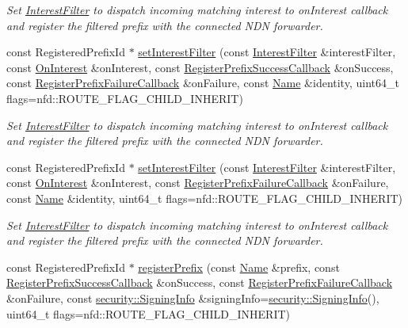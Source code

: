 \begin{DoxyCompactItemize}
\begin{DoxyCompactList}\small\item\em Set \hyperlink{classndn_1_1InterestFilter}{Interest\+Filter} to dispatch incoming matching interest to on\+Interest callback and register the filtered prefix with the connected N\+DN forwarder. \end{DoxyCompactList}\item 
const Registered\+Prefix\+Id $\ast$ \hyperlink{classndn_1_1Face_a95b9bd1df79b918bb8eef4943bc193c4}{set\+Interest\+Filter} (const \hyperlink{classndn_1_1InterestFilter}{Interest\+Filter} \&interest\+Filter, const \hyperlink{namespacendn_a6ddca075866d76508a3dd3b15533cac2}{On\+Interest} \&on\+Interest, const \hyperlink{namespacendn_a80b158f94737f73bec3f9af27161e899}{Register\+Prefix\+Success\+Callback} \&on\+Success, const \hyperlink{namespacendn_a691d213d0f708593217feeae517f3e45}{Register\+Prefix\+Failure\+Callback} \&on\+Failure, const \hyperlink{classndn_1_1Name}{Name} \&identity, uint64\+\_\+t flags=nfd\+::\+R\+O\+U\+T\+E\+\_\+\+F\+L\+A\+G\+\_\+\+C\+H\+I\+L\+D\+\_\+\+I\+N\+H\+E\+R\+IT)
\begin{DoxyCompactList}\small\item\em Set \hyperlink{classndn_1_1InterestFilter}{Interest\+Filter} to dispatch incoming matching interest to on\+Interest callback and register the filtered prefix with the connected N\+DN forwarder. \end{DoxyCompactList}\item 
const Registered\+Prefix\+Id $\ast$ \hyperlink{classndn_1_1Face_a7d7615722245eeac4c22be7124e26d7c}{set\+Interest\+Filter} (const \hyperlink{classndn_1_1InterestFilter}{Interest\+Filter} \&interest\+Filter, const \hyperlink{namespacendn_a6ddca075866d76508a3dd3b15533cac2}{On\+Interest} \&on\+Interest, const \hyperlink{namespacendn_a691d213d0f708593217feeae517f3e45}{Register\+Prefix\+Failure\+Callback} \&on\+Failure, const \hyperlink{classndn_1_1Name}{Name} \&identity, uint64\+\_\+t flags=nfd\+::\+R\+O\+U\+T\+E\+\_\+\+F\+L\+A\+G\+\_\+\+C\+H\+I\+L\+D\+\_\+\+I\+N\+H\+E\+R\+IT)
\begin{DoxyCompactList}\small\item\em Set \hyperlink{classndn_1_1InterestFilter}{Interest\+Filter} to dispatch incoming matching interest to on\+Interest callback and register the filtered prefix with the connected N\+DN forwarder. \end{DoxyCompactList}\item 
const Registered\+Prefix\+Id $\ast$ \hyperlink{classndn_1_1Face_adc0ac1eddbbf53114d7e824595b45f34}{register\+Prefix} (const \hyperlink{classndn_1_1Name}{Name} \&prefix, const \hyperlink{namespacendn_a80b158f94737f73bec3f9af27161e899}{Register\+Prefix\+Success\+Callback} \&on\+Success, const \hyperlink{namespacendn_a691d213d0f708593217feeae517f3e45}{Register\+Prefix\+Failure\+Callback} \&on\+Failure, const \hyperlink{classndn_1_1security_1_1SigningInfo}{security\+::\+Signing\+Info} \&signing\+Info=\hyperlink{classndn_1_1security_1_1SigningInfo}{security\+::\+Signing\+Info}(), uint64\+\_\+t flags=nfd\+::\+R\+O\+U\+T\+E\+\_\+\+F\+L\+A\+G\+\_\+\+C\+H\+I\+L\+D\+\_\+\+I\+N\+H\+E\+R\+IT)

\end{DoxyCompactItemize}

